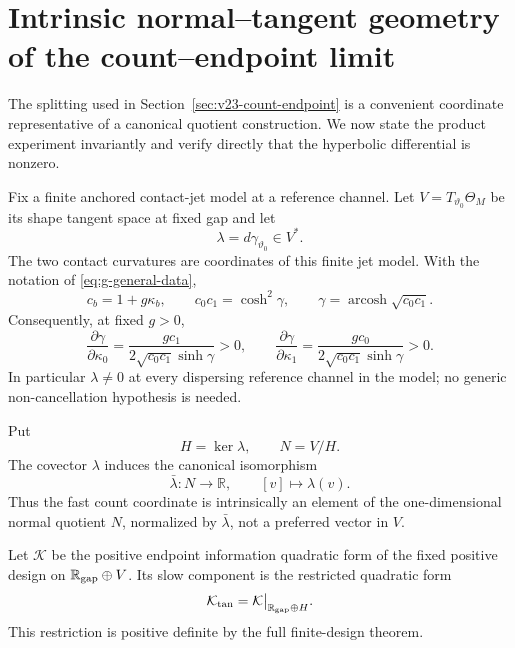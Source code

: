 \section{Intrinsic normal--tangent geometry of the count--endpoint limit}
\label{sec:v24-intrinsic-count-geometry}

The splitting used in Section~\ref{sec:v23-count-endpoint} is a convenient
coordinate representative of a canonical quotient construction.  We now
state the product experiment invariantly and verify directly that the
hyperbolic differential is nonzero.

Fix a finite anchored contact-jet model at a reference channel.  Let
\(V=T_{\vartheta_0}\Theta_M\) be its shape tangent space at fixed gap and let
\begin{equation}\label{eq:v24-hyperbolic-covector}
                         \lambda=d\gamma_{\vartheta_0}\in V^*.
\end{equation}
The two contact curvatures are coordinates of this finite jet model.  With the
notation of \eqref{eq:g-general-data},
\[
 c_b=1+g\kappa_b,
 \qquad c_0c_1=\cosh^2\gamma,
 \qquad
 \gamma=\operatorname{arcosh}\sqrt{c_0c_1}.
\]
Consequently, at fixed \(g>0\),
\begin{equation}\label{eq:v24-gamma-curvature-derivatives}
 \frac{\partial\gamma}{\partial\kappa_0}
 =\frac{g c_1}{2\sqrt{c_0c_1}\sinh\gamma}>0,
 \qquad
 \frac{\partial\gamma}{\partial\kappa_1}
 =\frac{g c_0}{2\sqrt{c_0c_1}\sinh\gamma}>0.
\end{equation}
In particular \(\lambda\ne0\) at every dispersing reference channel in the
model; no generic non-cancellation hypothesis is needed.

Put
\begin{equation}\label{eq:v24-normal-tangent-spaces}
 H=\ker\lambda,
 \qquad N=V/H.
\end{equation}
The covector \(\lambda\) induces the canonical isomorphism
\begin{equation}\label{eq:v24-normal-coordinate}
 \bar\lambda:N\longrightarrow\mathbb R,
 \qquad [v]\longmapsto\lambda(v).
\end{equation}
Thus the fast count coordinate is intrinsically an element of the
one-dimensional normal quotient \(N\), normalized by \(\bar\lambda\), not a
preferred vector in \(V\).

Let \(\mathcal K\) be the positive endpoint information quadratic form of the
fixed positive design on \(\mathbb R_{\rm gap}\oplus V\).  Its slow component
is the restricted quadratic form
\begin{equation}\label{eq:v24-tangent-information}
 \mathcal K_{\rm tan}
 =\mathcal K\big|_{\mathbb R_{\rm gap}\oplus H}.
\end{equation}
This restriction is positive definite by the full finite-design theorem.

